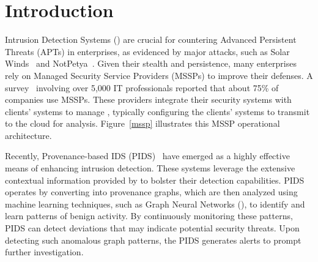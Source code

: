 \section{Introduction}
\label{s:intro}




Intrusion Detection Systems (\ids) are crucial for countering Advanced Persistent Threats (APTs) in enterprises, as evidenced by major attacks, such as Solar Winds~\cite{solarwinds} and NotPetya~\cite{notpetya}. Given their stealth and persistence, many enterprises rely on Managed Security Service Providers (MSSPs) to improve their defenses. A survey~\cite{msspsurvey} involving over 5,000 IT professionals reported that about 75\% of companies use MSSPs. These providers integrate their security systems with clients' systems to manage \logs, typically configuring the clients' systems to transmit \logs to the cloud for analysis. Figure~\ref{mssp} illustrates this MSSP operational architecture.


Recently, Provenance-based IDS (PIDS)~\cite{streamspot,provdetector2020,wang2022threatrace,shadewatcher,yangprographer,han2020unicorn} have emerged as a highly effective means of enhancing intrusion detection. These systems leverage the extensive contextual information provided by \logs to bolster their detection capabilities. PIDS operates by converting \logs into provenance graphs, which are then analyzed using machine learning techniques, such as Graph Neural Networks (\gnnshort), to identify and learn patterns of benign activity. By continuously monitoring these patterns, PIDS can detect deviations that may indicate potential security threats. Upon detecting such anomalous graph patterns, the PIDS generates alerts to prompt further investigation.


